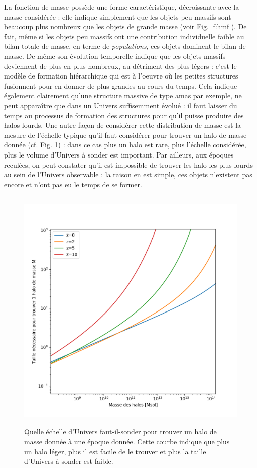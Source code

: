 La fonction de masse possède une forme caractéristique, décroissante avec la masse considérée : elle indique simplement que les objets peu massifs sont beaucoup plus nombreux que les objets de grande masse (voir Fig. \ref{f:hmf}). De fait, même si les objets peu massifs ont une contribution individuelle faible au bilan totale de masse, en terme de \textit{populations}, ces objets dominent le bilan de masse. De même son évolution temporelle indique que les objets massifs deviennent de plus en plus nombreux, au détriment des plus légers : c'est le modèle de formation hiérarchique qui est à l'oeuvre où les petites structures fusionnent pour en donner de plus grandes au cours du temps. Cela indique également clairement qu'une structure massive de type amas par exemple, ne peut apparaître que dans un Univers suffisemment évolué : il faut laisser du temps au processus de formation des structures pour qu'il puisse produire des halos lourds. Une autre façon de considérer cette distribution de masse est la mesure de l'échelle typique qu'il faut considérer pour trouver un halo de masse donnée (cf. Fig. \ref{f:L}) : dans ce cas plus un halo est rare, plus l'échelle considérée, plus le volume d'Univers à sonder est important. Par ailleurs, aux époques reculées, on peut constater qu'il est impossible de trouver les halo les plus lourds au sein de l'Univers observable : la raison en est simple, ces objets n'existent pas encore et n'ont pas eu le temps de se former.

\begin{figure}[htbp]
	\centering
		\includegraphics[height=12cm]{figs/L.png}
	\caption{Quelle échelle d'Univers faut-il-sonder pour trouver un halo de masse donnée à une époque donnée. Cette courbe indique que plus un halo léger, plus il est facile de le trouver et plus la taille d'Univers à sonder est faible.} 
	\label{f:L}
\end{figure}

